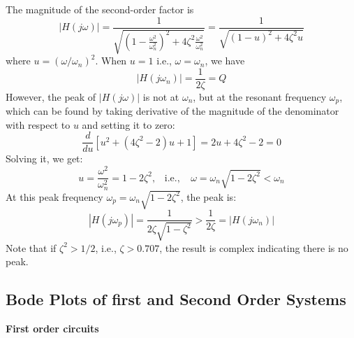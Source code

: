\documentclass{article}
\begin{document}
  The magnitude of the second-order factor is
  \begin{equation} |H(j\omega)|
  =\frac{1}{\sqrt{(1-\frac{\omega^2}{\omega_n^2})^2+4\zeta^2 \frac{\omega^2}{\omega_n^2}}}
  =\frac{1}{\sqrt{(1-u)^2+4\zeta^2 u}} \end{equation}
  where $u=(\omega/\omega_n)^2$. When $u=1$ i.e., $\omega=\omega_n$, we have
  \begin{equation} | H(j\omega_n) |=\frac{1}{2\zeta}=Q \end{equation}
  However, the peak of $|H(j\omega)|$ is not at $\omega_n$, but at the resonant frequency 
  $\omega_p$, which can be found by taking derivative of the magnitude of the denominator 
  with respect to $u$ and setting it to zero:
  \begin{equation} \frac{d}{du}[u^2+(4\zeta^2-2)u+1]=2u+4\zeta^2-2=0 \end{equation}
  Solving it, we get:
  \begin{equation} u=\frac{\omega^2}{\omega_n^2}=1-2\zeta^2,\;\;\;\mbox{i.e.,}
  \;\;\;\;\omega=\omega_n\sqrt{1-2\zeta^2} < \omega_n \end{equation}
  At this peak frequency $\omega_p=\omega_n\sqrt{1-2\zeta^2}$, the peak is:
  \begin{equation} | H(j\omega_p) |=\frac{1}{2\zeta\sqrt{1-\zeta^2}} > \frac{1}{2\zeta}=| H(j\omega_n) | \end{equation}
  Note that if $\zeta^2>1/2$, i.e., $\zeta>0.707$, the result is complex indicating there 
  is no peak.


\subsection*{Bode Plots of first and Second Order Systems}
{\bf First order circuits}

\end{document}
